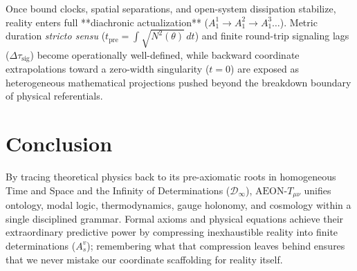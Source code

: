 \documentclass[11pt,a4paper]{article}
\begin{document}
Once bound clocks, spatial separations, and open-system dissipation stabilize, reality enters full **diachronic actualization** ($A_1^1 \to A_1^2 \to A_1^3 \dots$). Metric duration \emph{stricto sensu} ($t_{\mathrm{pre}} = \int \sqrt{N^2(\theta)}\,dt$) and finite round-trip signaling lags ($\Delta\tau_{\mathrm{sig}}$) become operationally well-defined, while backward coordinate extrapolations toward a zero-width singularity ($t = 0$) are exposed as heterogeneous mathematical projections pushed beyond the breakdown boundary of physical referentials.

\section{Conclusion}

By tracing theoretical physics back to its pre-axiomatic roots in homogeneous Time and Space and the Infinity of Determinations ($\mathcal{D}_\infty$), $\text{AEON-}T_{\mu\nu}$ unifies ontology, modal logic, thermodynamics, gauge holonomy, and cosmology within a single disciplined grammar. Formal axioms and physical equations achieve their extraordinary predictive power by compressing inexhaustible reality into finite determinations ($A_s^v$); remembering what that compression leaves behind ensures that we never mistake our coordinate scaffolding for reality itself.
\end{document}
